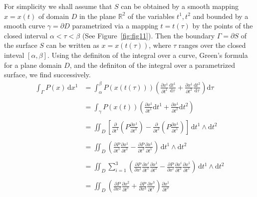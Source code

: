 \documentclass[a4paper,12pt]{article}
\begin{document}
\begin{CJK}{UTF8}{gbsn}
For simplicity we shall assume that $S$ can be obtained by a smooth 
mapping $x = x(t)$ of domain $D$ in the plane $\mathbb{R}^2$ of the 
variables $t^1, t^2$ and bounded by a smooth curve $\gamma = \partial D$
parametrized via a mapping $t = t(\tau)$ by the points of the closed 
interval $\alpha < \tau < \beta$ (See Figure~\ref{fig:fig11}). Then the boundary 
$\Gamma = \partial S$ of the surface $S$ can be written as $x = x(t(\tau))$,
where $\tau$ ranges over the closed inteval $[\alpha, \beta]$.
Using the definiton of the integral over a curve, Green's 
formula for a plane domain $D$, and the definiton of the integral 
over a parametrized surface, we find successively.
\[
    \begin{split}
        \int_{\Gamma}P(x)\,\mathrm{d}x^1& = \int_{\alpha}^{\beta}
        P\left(x(t(\tau))\right)\left(\frac{\partial x^1}{\partial t^1} \frac{\mathrm{d} t^1}{\mathrm{d}\tau} 
        + \frac{\partial x^1}{\partial t^2} \frac{\mathrm{d} t^2}{\mathrm{d}\tau}\right)
        \mathrm{d}\tau \\\\
        & = \int_{\gamma} P\left(x(t)\right)\left(\frac{\partial x^1}{\partial t^1} {\mathrm{d}t^1} 
        + \frac{\partial x^1}{\partial t^2}{\mathrm{d}t^2}\right)\\\\
        & = \iint_D \left[\frac{\partial}{\partial t^1}\left(P\frac{\partial x^1}{\partial t^2}\right)
        - \frac{\partial}{\partial t^2}\left(P\frac{\partial x^1}{\partial t^1}\right)\right]
        \,\mathrm{d}t^1 \wedge \mathrm{d}t^2\\\\
        & = \iint_D\left(\frac{\partial P}{\partial t^1}\frac{\partial x^1}{\partial t^2} - 
        \frac{\partial P}{\partial t^2}\frac{\partial x^1}{\partial t^1} \right)
        \,\mathrm{d}t^1 \wedge \mathrm{d}t^2\\\\
        & = \iint_D \sum_{i=1}^{3}\left(\frac{\partial P}{\partial x^i}\frac{\partial x^i}{\partial t^1}
        \frac{\partial x^1}{\partial t^2}- 
        \frac{\partial P}{\partial x^i}\frac{\partial x^i}{\partial t^2}
        \frac{\partial x^1}{\partial t^1}\right)
        \,\mathrm{d}t^1 \wedge \mathrm{d}t^2\\\\
        & = \iint_D \left(\frac{\partial P}{\partial x^2}\frac{\partial x^2}{\partial t^1} 
        + \frac{\partial P}{\partial x^3}\frac{\partial x^3}{\partial t^1}\right)\frac{\partial x^1}{\partial t^2}\\\\

\end{split}\]
\end{CJK}
\end{document}
